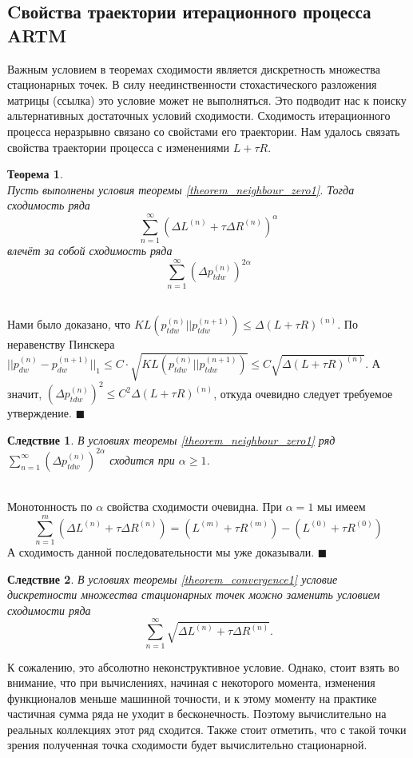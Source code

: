 \documentclass[12pt]{article}
\newtheorem{theorem}{Теорема}
\newtheorem{conseq}{Следствие}[theorem]
\newenvironment{Proof} 
	{\par\noindent{\bf Доказательство.}} 
	{\hfill$\blacksquare$}
\renewcommand{\leq}{\leqslant}
\renewcommand{\geq}{\geqslant}
\begin{document}
	\subsection{Cвойства траектории итерационного процесса ARTM}
Важным условием в теоремах сходимости является дискретность множества стационарных точек. В силу неединственности стохастического разложения матрицы (ссылка) это условие может не выполняться. Это подводит нас к поиску альтернативных достаточных условий сходимости. Сходимость итерационного процесса неразрывно связано со свойстами его траектории. Нам удалось связать свойства траектории процесса с изменениями $L + \tau R$.
\begin{theorem} \label{theorem_series}\ \\
	Пусть выполнены условия теоремы \ref{theorem_neighbour_zero1}. Тогда сходимость ряда
	\[
		\sum\limits_{n=1}^{\infty} (\Delta L^{(n)} + \tau \Delta R^{(n)})^{\alpha}
	\]
	влечёт за собой сходимость ряда
	\[
		\sum\limits_{n=1}^{\infty} (\Delta p_{tdw}^{(n)})^{2 \alpha}
	\]
\end{theorem}
\begin{Proof}\ \\
Нами было доказано, что $KL(p_{tdw}^{(n)}||p_{tdw}^{(n + 1)}) \leq \Delta (L + \tau R)^{(n)}$. По неравенству Пинскера $|| p_{dw}^{(n)} - p_{dw}^{(n+1)}||_1 \leq C \cdot \sqrt{KL(p_{tdw}^{(n)}||p_{tdw}^{(n+1)})} \leq C \sqrt{\Delta (L + \tau R)^{(n)}}$. А значит, $ (\Delta p_{tdw}^{(n)})^{2} \leq C^2 \Delta (L + \tau R)^{(n)} $, откуда очевидно следует требуемое утверждение.
\end{Proof}\ \\
\begin{conseq}
В условиях теоремы  \ref{theorem_neighbour_zero1} ряд  $\sum\limits_{n=1}^{\infty} (\Delta p_{tdw}^{(n)})^{2 \alpha}$ сходится при $\alpha \geq 1$.
\end{conseq}
\begin{Proof}\ \\
Монотонность по $\alpha$ свойства сходимости очевидна. При $\alpha=1$ мы имеем
\[
\sum\limits_{n=1}^{m} (\Delta L^{(n)} + \tau \Delta R^{(n)}) = ( L^{(m)} + \tau R^{(m)}) - ( L^{(0)} + \tau R^{(0)})
\]
А сходимость данной последовательности мы уже доказывали.
\end{Proof}\ \\
\begin{conseq}
В условиях теоремы  \ref{theorem_convergence1} условие дискретности множества стационарных точек можно заменить условием сходимости ряда
\[
\sum\limits_{n=1}^{\infty} \sqrt{\Delta L^{(n)} + \tau \Delta R^{(n)}}.
\]
\end{conseq}
К сожалению, это абсолютно неконструктивное условие. Однако, стоит взять во внимание, что при вычислениях, начиная с некоторого момента, изменения функционалов меньше машинной точности, и к этому моменту на практике частичная сумма ряда не уходит в бесконечность. Поэтому вычислительно на реальных коллекциях этот ряд сходится. Также стоит отметить, что с такой точки зрения полученная точка  сходимости будет вычислительно стационарной.
\end{document}

